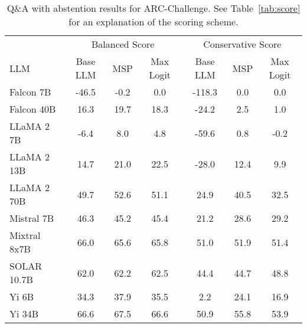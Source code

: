 \begin{table*}
\centering
\caption{Q\&A with abstention results for ARC-Challenge. See Table~\ref{tab:score} for an explanation of the scoring scheme.}
\label{tab:arc_score}
\begin{tabular}{lcccccc}
\toprule
& \multicolumn{3}{c}{Balanced Score} & \multicolumn{3}{c}{Conservative Score} \\ 
LLM & Base LLM & MSP & Max Logit & Base LLM & MSP & Max Logit\\
\cmidrule(lr){1-1} \cmidrule(lr){2-4} \cmidrule(lr){5-7}
Falcon 7B & -46.5 & -0.2 & 0.0 & -118.3 & 0.0 & 0.0\\
Falcon 40B & 16.3 & 19.7 & 18.3 & -24.2 & 2.5 & 1.0\\
LLaMA 2 7B & -6.4 & 8.0 & 4.8 & -59.6 & 0.8 & -0.2\\
LLaMA 2 13B & 14.7 & 21.0 & 22.5 & -28.0 & 12.4 & 9.9\\
LLaMA 2 70B & 49.7 & 52.6 & 51.1 & 24.9 & 40.5 & 32.5\\
Mistral 7B & 46.3 & 45.2 & 45.4 & 21.2 & 28.6 & 29.2\\
Mixtral 8x7B & 66.0 & 65.6 & 65.8 & 51.0 & 51.9 & 51.4\\
SOLAR 10.7B & 62.0 & 62.2 & 62.5 & 44.4 & 44.7 & 48.8\\
Yi 6B & 34.3 & 37.9 & 35.5 & 2.2 & 24.1 & 16.9\\
Yi 34B & 66.6 & 67.5 & 66.6 & 50.9 & 55.8 & 53.9\\
\bottomrule
\end{tabular}
\end{table*}
